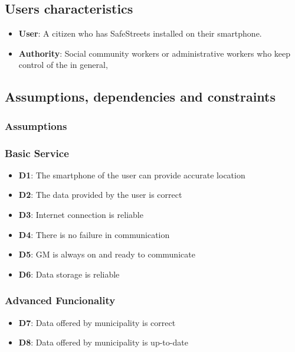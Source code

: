 \subsection{Users characteristics}

\begin{itemize}
    \item \textbf{User}: A citizen who has SafeStreets installed on their smartphone.
    \item \textbf{Authority}: Social community workers or administrative workers who 
    keep control of the in general,
\end{itemize}

\subsection{Assumptions, dependencies and constraints}

\subsubsection{Assumptions}

\subsubsection*{Basic Service}

\begin{itemize}
    \item \textbf{D1}: The smartphone of the user can provide accurate location
    \item \textbf{D2}: The data provided by the user is correct
    \item \textbf{D3}: Internet connection is reliable
    \item \textbf{D4}: There is no failure in communication
    \item \textbf{D5}: GM is always on and ready to communicate
    \item \textbf{D6}: Data storage is reliable
\end{itemize}

\subsubsection*{Advanced Funcionality}

\begin{itemize}
    \item \textbf{D7}: Data offered by municipality is correct
    \item \textbf{D8}: Data offered by municipality is up-to-date
\end{itemize}

